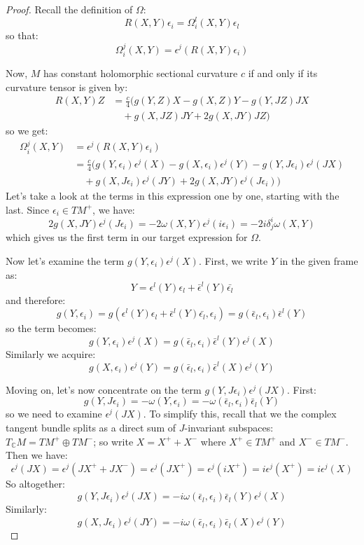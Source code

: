 \documentclass[11pt]{amsart}
\theoremstyle{definition}
\def \C{ \mathbb{C} }
\begin{document}
\begin{proof}
Recall the definition of $\Omega$:
%
$$ R(X,Y) \epsilon_i = \Omega^l_i (X,Y) \epsilon_l $$
%
so that:
%
$$ \Omega^j_i (X,Y) = \epsilon^j ( R(X,Y) \epsilon_i ) $$

Now, $M$ has constant holomorphic sectional curvature $c$ if and only if its curvature tensor is given by:
%
\begin{align*}
R(X,Y)Z &= \frac{c}{4} (g(Y,Z)X - g(X,Z)Y - g(Y,JZ)JX  \\
& \quad + g(X, JZ)JY + 2 g(X,JY)JZ )
\end{align*}
%
so we get:
%
\begin{align*}
\Omega^j_i (X,Y) &= \epsilon^j ( R(X,Y) \epsilon_i ) \\
&= \frac{c}{4} (g(Y, \epsilon_i ) \epsilon^j(X) - g(X, \epsilon_i ) \epsilon^j(Y) - g(Y,J \epsilon_i ) \epsilon^j (JX)  \\
& \quad + g(X, J \epsilon_i ) \epsilon^j (JY) + 2 g(X,JY)\epsilon^j( J \epsilon_i ) )
\end{align*}
%
Let's take a look at the terms in this expression one by one, starting with the last.  Since $\epsilon_i \in TM^{+}$, we have:
%
$$ 2 g(X,JY)\epsilon^j( J \epsilon_i )= - 2 \omega( X, Y ) \epsilon^j ( i \epsilon_i ) = - 2 i \delta^i_j \omega( X, Y ) $$
%
which gives us the first term in our target expression for $\Omega$.  

Now let's examine the term $g( Y, \epsilon_i ) \epsilon^j(X)$.  First, we write $Y$ in the given frame as:
%
$$ Y = \epsilon^l (Y) \epsilon_l + \bar{ \epsilon }^l (Y) \bar{ \epsilon_l } $$
%
and therefore:
%
$$ g( Y, \epsilon_i ) = g( \epsilon^l (Y) \epsilon_l + \bar{ \epsilon }^l (Y) \bar{ \epsilon_l }, \epsilon_i ) = g( \bar{ \epsilon }_l, \epsilon_i ) \bar{ \epsilon }^l (Y) $$
%
so the term becomes:
%
$$ g( Y, \epsilon_i ) \epsilon^j(X) = g( \bar{ \epsilon }_l, \epsilon_i ) \bar{ \epsilon }^l (Y) \epsilon^j(X) $$
%
Similarly we acquire:
%
$$ g(X, \epsilon_i ) \epsilon^j(Y) = g( \bar{\epsilon}_l, \epsilon_i ) \bar{ \epsilon }^l (X) \epsilon^j (Y) $$

Moving on, let's now concentrate on the term $g(Y,J \epsilon_i ) \epsilon^j (JX)$.  First:
%
$$ g(Y,J \epsilon_i ) = - \omega( Y, \epsilon_i ) = - \omega( \bar{ \epsilon }_l, \epsilon_i ) \bar{ \epsilon }_l (Y) $$
%
so we need to examine $\epsilon^j (JX)$.  To simplify this, recall that we the complex tangent bundle splits as a direct sum of $J$-invariant subspaces: $T_{\C} M = TM^{+} \oplus TM^{-}$; so write $X = X^{+} + X^{-}$ where $X^{+} \in TM^{+}$ and $X^{-} \in TM^{-}$.  Then we have:
%
$$ \epsilon^j (JX) = \epsilon^j ( JX^{+} + JX^{-} ) = \epsilon^j( JX^{+} ) = \epsilon^j( i X^{+} ) = i \epsilon^j ( X^{+} ) = i \epsilon^j (X) $$
%
So altogether:
%
$$ g(Y,J \epsilon_i ) \epsilon^j (JX) = - i \omega( \bar{ \epsilon }_l, \epsilon_i ) \bar{ \epsilon }_l (Y) \epsilon^j (X) $$
%
Similarly:
%
$$ g(X, J \epsilon_i ) \epsilon^j (JY) = - i \omega( \bar{ \epsilon }_l, \epsilon_i ) \bar{ \epsilon }_l (X) \epsilon^j (Y) $$


\end{proof}
\end{document}
